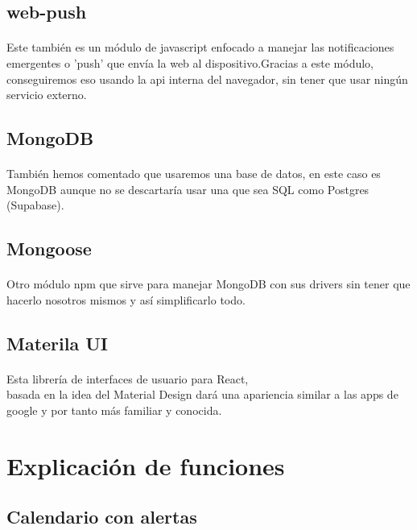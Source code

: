 \documentclass[a4paper]{article}
\begin{document}
\subsection[Web-Push]{web-push}
\paragraph{}
Este también es un módulo de javascript enfocado a manejar las notificaciones emergentes o 'push'
que envía la web al dispositivo.Gracias a este módulo, conseguiremos eso usando la api interna del
navegador, sin tener que usar ningún servicio externo.
\subsection[MongoDB]{MongoDB}
\paragraph{}
También hemos comentado que usaremos una base de datos, en este caso es MongoDB aunque
no se descartaría usar una que sea SQL como Postgres (Supabase).
\subsection[Mongoose]{Mongoose}
\paragraph{}
Otro módulo npm que sirve para manejar MongoDB con sus drivers sin tener que hacerlo
nosotros mismos y así simplificarlo todo.
\subsection[MUI]{Materila UI}
\paragraph{}
Esta librería de interfaces de usuario para React,\\ basada en la idea del Material Design
dará una apariencia similar a las apps de google y por tanto más familiar y conocida.
\section[Explicación de funciones]{Explicación de funciones}
\subsection[Calendario]{Calendario con alertas}
\end{document}
